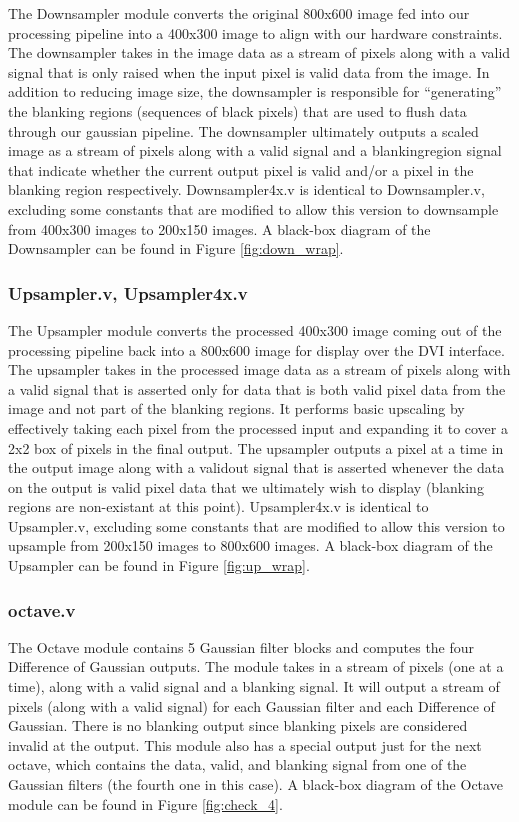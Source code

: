 The Downsampler module converts the original 800x600 image fed into our processing
pipeline into a 400x300 image to align with our hardware constraints. The downsampler
takes in the image data as a stream of pixels along with a valid signal that is
only raised when the input pixel is valid data from the image. In addition to 
reducing image size, the downsampler is responsible for ``generating'' the 
blanking regions (sequences of black pixels) that are used to flush data 
through our gaussian pipeline. The downsampler ultimately outputs a scaled 
image as a stream of pixels along with a valid signal and a blankingregion 
signal that indicate whether the current output pixel is valid and/or a pixel
in the blanking region respectively. Downsampler4x.v is identical to 
Downsampler.v, excluding some constants that are modified to allow this version 
to downsample from 400x300 images to 200x150 images. A black-box diagram of the Downsampler
can be found in Figure \ref{fig:down_wrap}.

\subsubsection{Upsampler.v, Upsampler4x.v}

The Upsampler module converts the processed 400x300 image coming out of the processing
pipeline back into a 800x600 image for display over the DVI interface. The upsampler
takes in the processed image data as a stream of pixels along with a valid signal 
that is asserted only for data that is both valid pixel data from the image and
not part of the blanking regions. It performs basic upscaling by effectively taking
each pixel from the processed input and expanding it to cover a 2x2 box of 
pixels in the final output. The upsampler outputs a pixel at a time in the output 
image along with a validout signal that is asserted whenever the data on the 
output is valid pixel data that we ultimately wish to display (blanking regions
are non-existant at this point). Upsampler4x.v is identical to Upsampler.v, 
excluding some constants that are modified to allow this version to upsample 
from 200x150 images to 800x600 images. A black-box diagram of the Upsampler
can be found in Figure \ref{fig:up_wrap}.


\subsubsection{octave.v}

The Octave module contains 5 Gaussian filter blocks and computes the four 
Difference of Gaussian outputs. The module takes in a stream of pixels (one at 
a time), along with a valid signal and a blanking signal. It will output a 
stream of pixels (along with a valid signal) for each Gaussian filter and each 
Difference of Gaussian. There is no blanking output since blanking pixels are 
considered invalid at the output. This module also has a special output just 
for the next octave, which contains the data, valid, and blanking signal from 
one of the Gaussian filters (the fourth one in this case). A black-box diagram
of the Octave module can be found in Figure \ref{fig:check_4}.

